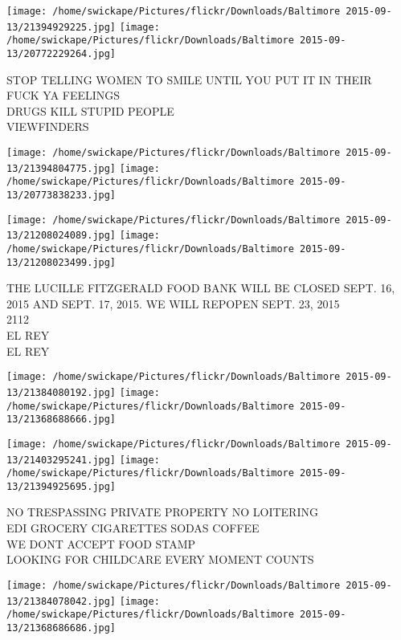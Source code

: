 \documentclass[10pt,letterpaper]{article}
\begin{document}
\texttt{[image: /home/swickape/Pictures/flickr/Downloads/Baltimore 2015-09-13/21394929225.jpg]}
\texttt{[image: /home/swickape/Pictures/flickr/Downloads/Baltimore 2015-09-13/20772229264.jpg]}

STOP TELLING WOMEN TO SMILE UNTIL YOU PUT IT IN THEIR\\
FUCK YA FEELINGS\\
DRUGS KILL STUPID PEOPLE\\
VIEWFINDERS\\
\pagebreak

\texttt{[image: /home/swickape/Pictures/flickr/Downloads/Baltimore 2015-09-13/21394804775.jpg]}
\texttt{[image: /home/swickape/Pictures/flickr/Downloads/Baltimore 2015-09-13/20773838233.jpg]}

\texttt{[image: /home/swickape/Pictures/flickr/Downloads/Baltimore 2015-09-13/21208024089.jpg]}
\texttt{[image: /home/swickape/Pictures/flickr/Downloads/Baltimore 2015-09-13/21208023499.jpg]}

THE LUCILLE FITZGERALD FOOD BANK WILL BE CLOSED SEPT. 16, 2015 AND SEPT. 17, 2015.  WE WILL REPOPEN SEPT. 23, 2015\\
2112\\
EL REY\\
EL REY\\
\pagebreak

\texttt{[image: /home/swickape/Pictures/flickr/Downloads/Baltimore 2015-09-13/21384080192.jpg]}
\texttt{[image: /home/swickape/Pictures/flickr/Downloads/Baltimore 2015-09-13/21368688666.jpg]}

\texttt{[image: /home/swickape/Pictures/flickr/Downloads/Baltimore 2015-09-13/21403295241.jpg]}
\texttt{[image: /home/swickape/Pictures/flickr/Downloads/Baltimore 2015-09-13/21394925695.jpg]}

NO TRESPASSING PRIVATE PROPERTY NO LOITERING\\
EDI GROCERY CIGARETTES SODAS COFFEE\\
WE DONT ACCEPT FOOD STAMP\\
LOOKING FOR CHILDCARE EVERY MOMENT COUNTS\\
\pagebreak

\texttt{[image: /home/swickape/Pictures/flickr/Downloads/Baltimore 2015-09-13/21384078042.jpg]}
\texttt{[image: /home/swickape/Pictures/flickr/Downloads/Baltimore 2015-09-13/21368686686.jpg]}
\end{document}
